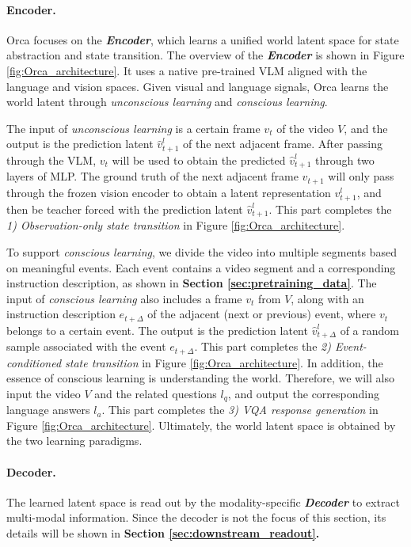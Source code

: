 \documentclass{llmxive}
\begin{document}
\paragraph{Encoder.} 
Orca focuses on the \textit{\textbf{Encoder}}, which learns a unified world latent space for state abstraction and state transition.
The overview of the \textit{\textbf{Encoder}} is shown in Figure \ref{fig:Orca_architecture}. It uses a native pre-trained VLM \citep{qwen35} aligned with the language and vision spaces. Given visual and language signals, Orca learns the world latent through \textit{unconscious learning} and \textit{conscious learning}.

The input of \textit{unconscious learning} is a certain frame $v_t$ of the video $V$, and the output is the prediction latent $\hat{v}^l_{t+1}$ of the next adjacent frame. After passing through the VLM, $v_t$ will be used to obtain the predicted $\hat{v}^l_{t+1}$ through two layers of MLP. The ground truth of the next adjacent frame $v_{t+1}$ will only pass through the frozen vision encoder to obtain a latent representation $v^l_{t+1}$, and then be teacher forced with the prediction latent $\hat{v}^l_{t+1}$. This part completes the \textit{1) Observation-only state transition} in Figure \ref{fig:Orca_architecture}.

To support \textit{conscious learning}, we divide the video into multiple segments based on meaningful events. Each event contains a video segment and a corresponding instruction description, as shown in \textbf{Section \ref{sec:pretraining_data}}. The input of \textit{conscious learning} also includes a frame $v_t$ from $V$, along with an instruction description $e_{t+\Delta}$ of the adjacent (next or previous) event, where $v_t$ belongs to a certain event. The output is the prediction latent $\hat{v}^l_{t+\Delta}$ of a random sample associated with the event $e_{t+\Delta}$. This part completes the \textit{2) Event-conditioned state transition} in Figure \ref{fig:Orca_architecture}. In addition, the essence of conscious learning is understanding the world. Therefore, we will also input the video $V$ and the related questions $l_q$, and output the corresponding language answers $l_a$. This part completes the \textit{3) VQA response generation} in Figure \ref{fig:Orca_architecture}. Ultimately, the world latent space is obtained by the two learning paradigms. 

\paragraph{Decoder.} The learned latent space is read out by the modality-specific \textbf{\textit{Decoder}} to extract multi-modal information. Since the decoder is not the focus of this section, its details will be shown in \textbf{Section \ref{sec:downstream_readout}.}
\end{document}
